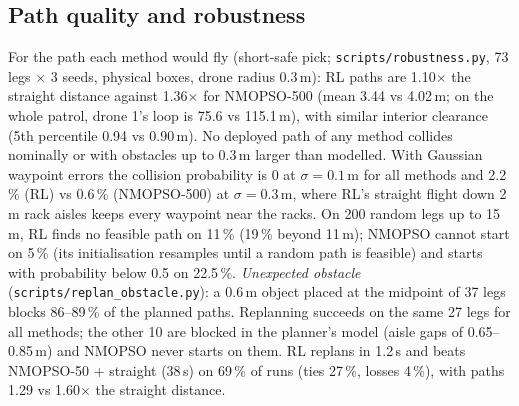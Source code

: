 \documentclass[conference]{IEEEtran}
\begin{document}
\subsection{Path quality and robustness}
For the path each method would fly (short-safe pick; \texttt{scripts/robustness.py}, 73 legs
$\times$ 3 seeds, physical boxes, drone radius 0.3\,m): RL paths are 1.10$\times$ the straight
distance against 1.36$\times$ for NMOPSO-500 (mean 3.44 vs 4.02\,m; on the whole patrol, drone 1's
loop is 75.6 vs 115.1\,m), with similar interior clearance (5th percentile 0.94 vs 0.90\,m). No
deployed path of any method collides nominally or with obstacles up to 0.3\,m larger than modelled.
With Gaussian waypoint errors the collision probability is 0 at $\sigma=0.1$\,m for all methods and
2.2\,\% (RL) vs 0.6\,\% (NMOPSO-500) at $\sigma=0.3$\,m, where RL's straight flight down 2\,m rack
aisles keeps every waypoint near the racks. On 200 random legs up to 15\,m, RL finds no feasible path
on 11\,\% (19\,\% beyond 11\,m); NMOPSO cannot start on 5\,\% (its initialisation resamples until a
random path is feasible) and starts with probability below 0.5 on 22.5\,\%.
\emph{Unexpected obstacle} (\texttt{scripts/replan\_obstacle.py}): a 0.6\,m object placed at the
midpoint of 37 legs blocks 86--89\,\% of the planned paths. Replanning succeeds on the same 27 legs
for all methods; the other 10 are blocked in the planner's model (aisle gaps of 0.65--0.85\,m) and
NMOPSO never starts on them. RL replans in 1.2\,s and beats NMOPSO-50 + straight (38\,s) on 69\,\%
of runs (ties 27\,\%, losses 4\,\%), with paths 1.29 vs 1.60$\times$ the straight distance.
\end{document}
